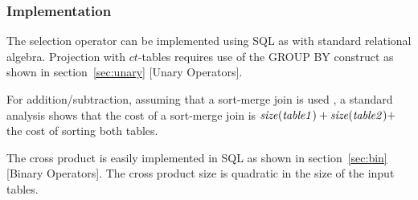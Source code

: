 \documentclass{sfuthesis}
\newcommand{\ct}{\mathit{ct}}
\begin{document}
\subsubsection{Implementation}\label{sec:imp}
The selection operator can be implemented  using SQL as with standard relational algebra. Projection with $\ct$-tables requires use of the GROUP BY construct as shown in section~\ref{sec:unary} [Unary Operators]. %

For addition/subtraction, assuming that a sort-merge join is used \cite{Ullman1982}, a standard analysis shows that the cost of a sort-merge join is $\it{size}(table1) + \it{size}(table2) +$ the cost of sorting both tables. 

The cross product is easily implemented in SQL as shown in section~\ref{sec:bin} [Binary Operators]. The cross product size is quadratic in the size of the input tables.
\end{document}
